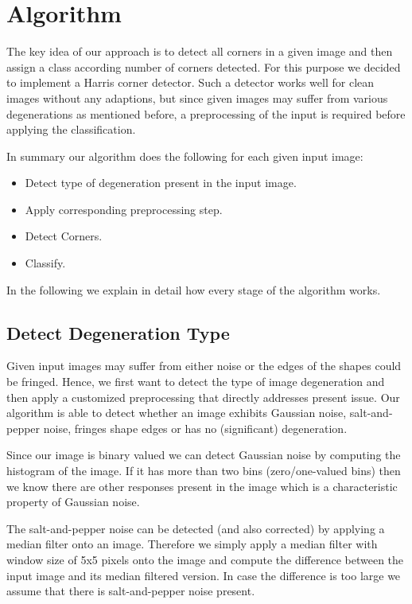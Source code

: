 \documentclass[conference]{IEEEtran}
\begin{document}
\section{Algorithm}
The key idea of our approach is to detect all corners in a given image and then assign a class according number of corners detected. 
For this purpose we decided to implement a Harris corner detector\cite{Harris88acombined}. 
Such a detector works well for clean images without any adaptions, 
but since given images may suffer from various degenerations as mentioned before, 
a preprocessing of the input is required before applying the classification. 

In summary our algorithm does the following for each given input image:
	\begin{itemize}
		\item Detect type of degeneration present in the input image.
		\item Apply corresponding preprocessing step.
		\item Detect Corners.
		\item Classify.
	\end{itemize}
	
In the following we explain in detail how every stage of the algorithm works.

\subsection{Detect Degeneration Type}
Given input images may suffer from either noise or the edges of the shapes could be fringed.
Hence, we first want to detect the type of image degeneration and then apply a customized preprocessing that directly addresses present issue. Our algorithm is able to detect whether an image exhibits Gaussian noise, salt-and-pepper noise, fringes shape edges or has no (significant) degeneration. 

Since our image is binary valued we can detect Gaussian noise by computing the histogram of the image. If it has more than two bins (zero/one-valued bins) then we know there are other responses present in the image which is a characteristic property of Gaussian noise. 

The salt-and-pepper noise can be detected (and also corrected) by applying a median filter onto an image. 
Therefore we simply apply a median filter with window size of 5x5 pixels onto the image and compute the difference between the input image and its median filtered version. 
In case the difference is too large we assume that there is salt-and-pepper noise present. 
\end{document}
